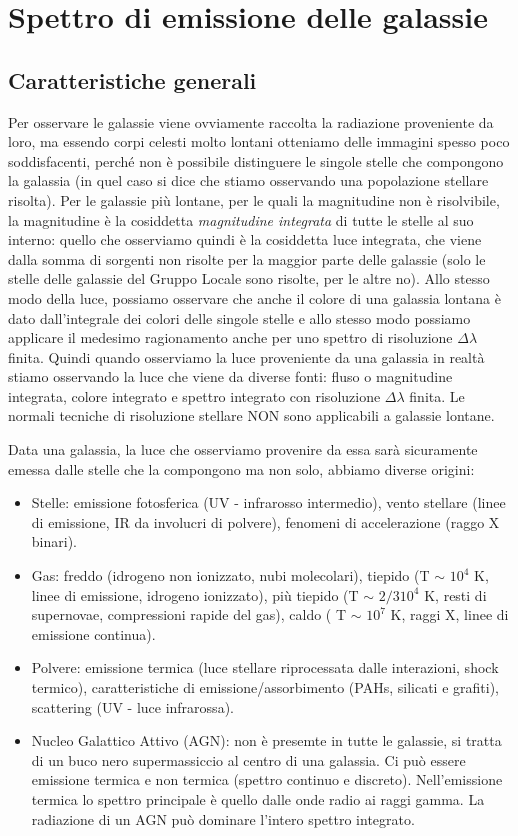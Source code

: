 \section{Spettro di emissione delle galassie}\label{sec:spettro-di-emissione-delle-galassie}
\subsection{Caratteristiche generali}
Per osservare le galassie viene ovviamente raccolta la radiazione proveniente da loro, ma essendo corpi celesti molto lontani otteniamo delle immagini spesso poco soddisfacenti, perché non è possibile distinguere le singole stelle che compongono la galassia (in quel caso si dice che stiamo osservando una popolazione stellare risolta). Per le galassie più lontane, per le quali la magnitudine non è risolvibile, la magnitudine è la cosiddetta \emph{magnitudine integrata} di tutte le stelle al suo interno: quello che osserviamo quindi è la cosiddetta luce integrata, che viene dalla somma di sorgenti non risolte per la maggior parte delle galassie (solo le stelle delle galassie del Gruppo Locale sono risolte, per le altre no). Allo stesso modo della luce, possiamo osservare che anche il colore di una galassia lontana è dato dall'integrale dei colori delle singole stelle e allo stesso modo possiamo applicare il medesimo ragionamento anche per uno spettro di risoluzione $\Delta\lambda$ finita. Quindi quando osserviamo la luce proveniente da una galassia in realtà stiamo osservando la luce che viene da diverse fonti: fluso o magnitudine integrata, colore integrato e spettro integrato con risoluzione $\Delta\lambda$ finita. Le normali tecniche di risoluzione stellare NON sono applicabili a galassie lontane.

Data una galassia, la luce che osserviamo provenire da essa sarà sicuramente emessa dalle stelle che la compongono ma non solo, abbiamo diverse origini:
\begin{itemize}
    \item Stelle: emissione fotosferica (UV - infrarosso intermedio), vento stellare (linee di emissione, IR da involucri di polvere), fenomeni di accelerazione (raggo X binari).
    \item Gas: freddo (idrogeno non ionizzato, nubi molecolari), tiepido (T $\sim$ $10^4$ K, linee di emissione, idrogeno ionizzato), più tiepido (T $\sim$ $2/3 10^4$ K, resti di supernovae, compressioni rapide del gas), caldo ( T $\sim$ $10^7$ K, raggi X, linee di emissione continua).
    \item Polvere: emissione termica (luce stellare riprocessata dalle interazioni, shock termico), caratteristiche di emissione/assorbimento (PAHs, silicati e grafiti), scattering (UV - luce infrarossa).
    \item Nucleo Galattico Attivo (AGN): non è presemte in tutte le galassie, si tratta di un buco nero supermassiccio al centro di una galassia. Ci può essere emissione termica e non termica (spettro continuo e discreto). Nell'emissione termica lo spettro principale è quello dalle onde radio ai raggi gamma. La radiazione di un AGN può dominare l'intero spettro integrato.
\end{itemize}

